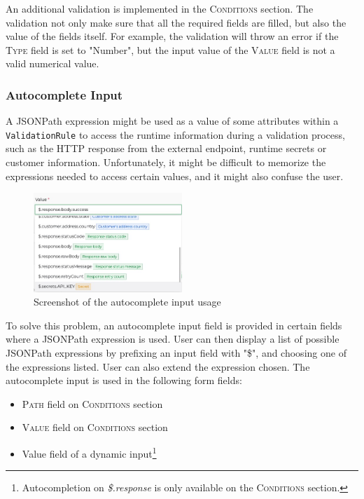       An additional validation is implemented in the \textsc{Conditions} section. The validation not only make sure that all the required fields are filled, but also the value of the fields itself. For example, the validation will throw an error if the \textsc{Type} field is set to "Number", but the input value of the \textsc{Value} field is not a valid numerical value. 

    \subsubsection{Autocomplete Input}

      A JSONPath expression might be used as a value of some attributes within a \verb;ValidationRule; to access the runtime information during a validation process, such as the HTTP response from the external endpoint, runtime secrets or customer information. Unfortunately, it might be difficult to memorize the expressions needed to access certain values, and it might also confuse the user. 

      \begin{figure}[!ht]
        \centering
        \includegraphics[width=0.5\textwidth]{images/ss_autocomplete.jpeg}
        \caption{Screenshot of the autocomplete input usage}
      \end{figure}

      To solve this problem, an autocomplete input field is provided in certain fields where a JSONPath expression is used. User can then display a list of possible JSONPath expressions by prefixing an input field with "\$", and choosing one of the expressions listed. User can also extend the expression chosen. The autocomplete input is used in the following form fields:

      \begin{itemize}
        \item \textsc{Path} field on \textsc{Conditions} section
        \item \textsc{Value} field on \textsc{Conditions} section
        \item Value field of a dynamic input\footnote{Autocompletion on \emph{\$.response} is only available on the \textsc{Conditions} section.}
      \end{itemize}

